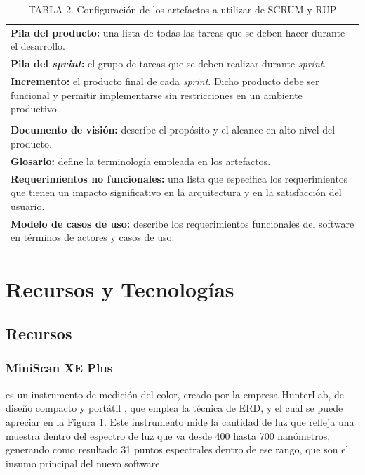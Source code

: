 \documentclass[conference]{IEEEtran}
\begin{document}
		\FloatBarrier %
		\begin{table}[htb]
			\caption{TABLA 2. Configuraci\'{o}n de los artefactos a utilizar de SCRUM y RUP}
			\label{tabla_2}
			\centering
			\setlength{\extrarowheight}{2.5pt}
			\begin{tabulary}{8.8cm}{|J|}
				\hline
				\\ \hline
				\textbf{Pila del producto: }una lista de todas las tareas que se deben hacer durante el desarrollo.\\ \hline
				\textbf{Pila del \textit{sprint}: }el grupo de tareas que se deben realizar durante \textit{sprint}.\\ \hline
				\textbf{Incremento: }el producto final de cada \textit{sprint}. Dicho producto debe ser funcional y permitir implementarse sin restricciones en un ambiente productivo.\\ \hline
				\\ \hline
				\textbf{Documento de visi\'{o}n: }describe el prop\'{o}sito y el alcance en alto nivel del producto.\\
\hline
				\textbf{Glosario: }define la terminolog\'{i}a empleada en los artefactos.\\ \hline
				\textbf{Requerimientos no funcionales: }una lista que especifica los requerimientos que tienen un impacto significativo en la arquitectura y en la satisfacci\'{o}n del usuario.\\ \hline
		\textbf{Modelo de casos de uso: }describe los requerimientos funcionales del software en t\'{e}rminos de actores y casos de uso.\\ \hline
			\end{tabulary}
		\end{table}
		\FloatBarrier %

\section{Recursos y Tecnolog\'{i}as}	
	
	\subsection{Recursos}
		\subsubsection{MiniScan XE Plus}
		es un instrumento de medici\'{o}n del color, creado por la empresa HunterLab, de dise\~{n}o compacto y port\'{a}til \cite{MiniScanXEPlus-manual}, que emplea la t\'{e}cnica de ERD, y el cual se puede apreciar en la Figura 1. Este instrumento mide la cantidad de luz que refleja una muestra dentro del espectro de luz que va desde 400 hasta 700 nan\'{o}metros, generando como resultado 31 puntos espectrales dentro de ese rango, que son el insumo principal del nuevo software.
		
\end{document}
